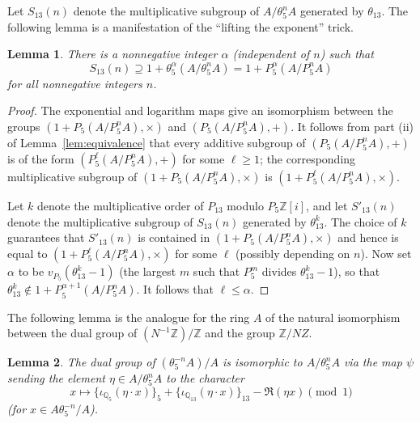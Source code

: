 \documentclass[11pt]{amsart}
\newtheorem{lemma}{Lemma}[section]
\theoremstyle{definition}
\newcommand{\Z}{{\mathbb Z}}
\begin{document}
Let $S_{13}(n)$ denote the multiplicative subgroup of $A/\theta_5^n A$ generated by $\theta_{13}$.  The following lemma is a manifestation of the ``lifting the exponent'' trick.

\begin{lemma}\label{lem:boundedsubgroup}
There is a nonnegative integer $\alpha$ (independent of $n$) such that
$$S_{13}(n) \supseteq 1 + \theta_5^{\alpha} (A/\theta_5^nA) = 1 + P_5^\alpha (A/P_5^n A)$$
for all nonnegative integers $n$.
\end{lemma}
\begin{proof}
The exponential and logarithm maps give an isomorphism between the groups $(1 + P_5(A/P_5^nA), \times)$ and $(P_5(A/P_5^nA), +)$. It follows from part (ii) of Lemma~\ref{lem:equivalence} that every additive subgroup of $(P_5(A/P_5^nA), +)$ is of the form $(P_5^\ell(A/P_5^n A), +)$ for some $\ell \ge 1$; the corresponding multiplicative subgroup of $(1 + P_5(A/P_5^nA), \times)$ is $(1 + P_5^\ell(A/P_5^nA), \times)$.

Let $k$ denote the multiplicative order of $P_{13}$ modulo $P_5 \Z[i]$, and let $S'_{13}(n)$ denote the multiplicative subgroup of $S_{13}(n)$ generated by $\theta_{13}^k$.  The choice of $k$ guarantees that $S'_{13}(n)$ is contained in $(1 + P_5(A/P_5^nA), \times)$ and hence is equal to $(1 + P_5^\ell(A/P_5^nA), \times)$ for some $\ell$ (possibly depending on $n$).  Now set $\alpha$ to be $v_{P_5}(\theta_{13}^k - 1)$ (the largest $m$ such that $P_5^m$ divides $\theta_{13}^k - 1$), so that $\theta_{13}^k \notin 1+ P_5^{\alpha+1}(A/P_5^n A)$.  It follows that $\ell \leq \alpha$.
\end{proof}

The following lemma is the analogue for the ring $A$ of the natural isomorphism between the dual group of $(N^{-1}\Z)/\Z$ and the group $\Z/NZ$.

\begin{lemma}\label{lem:dual}
The dual group of $(\theta_5^{-n}A)/A$ is isomorphic to $A/\theta_5^nA$ via the map $\psi$ sending the element $\eta \in A/\theta_5^nA$ to the character $$x \mapsto \{\iota_{\mathbb{Q}_5}(\eta \cdot x)\}_5 + \{\iota_{\mathbb{Q}_{13}}(\eta \cdot x)\}_{13} - \Re(\eta x) \pmod{1}$$
(for $x \in A\theta_5^{-n}/A$).
\end{lemma}
\end{document}
